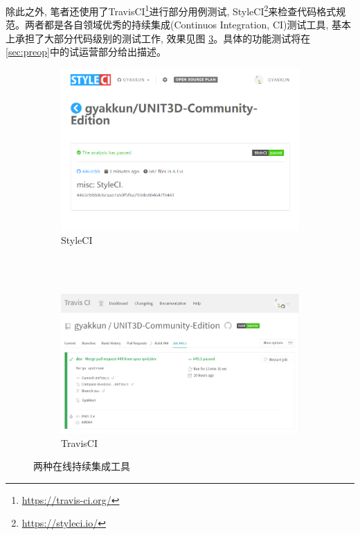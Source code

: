 
除此之外, 笔者还使用了TravisCI\footnote{\url{https://travis-ci.org/}}进行部分用例测试, StyleCI\footnote{\url{https://styleci.io/}}来检查代码格式规范。两者都是各自领域优秀的持续集成(Continuos Integration, CI)测试工具, 基本上承担了大部分代码级别的测试工作, 效果见图 \ref{fig:ci}。具体的功能测试将在\ref{sec:preop}中的试运营部分给出描述。

\begin{figure}[h]
	\centering
    \begin{subfigure}{0.8\textwidth}
		\centering
		\includegraphics[width=\textwidth]{support-files/4.1-style-ci.png}
		\caption{StyleCI}
		\label{fig:styleci}
    \end{subfigure} \\
    \vbox{}
    　\\
    \vbox{}
    \begin{subfigure}{0.8\textwidth}
		\centering
		\includegraphics[width=\textwidth]{support-files/4.1-travis-ci.png}
		\caption{TravisCI}
		\label{fig:travisci}
	\end{subfigure} 
    \caption{两种在线持续集成工具}
	\label{fig:ci}
\end{figure}

